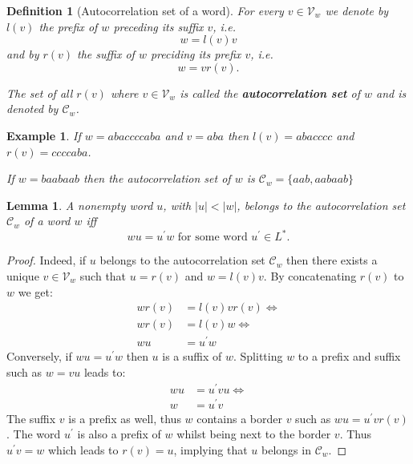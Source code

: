\documentclass[12pt]{report}
\newtheorem{lemma}{Lemma}
\newtheorem{defn}[mythm]{Definition}
\newtheorem{exa}[mythm]{Example}
\begin{document}
{%

\begin{defn}[Autocorrelation set of a word]
For every $v \in \mathcal{V}_w$ we denote by $l(v)$ the prefix of $w$ preceding its suffix $v$, i.e. 
\[ w = l(v) v\] and by $r(v)$ the suffix of $w$ preciding its prefix $v$, i.e. \[w = v r(v).\]

The set of all $r(v)$ where $v \in \mathcal{V}_w$ is called the {\bf autocorrelation set} of $w$ and is denoted by $\mathcal{C}_w$.
\end{defn}

\begin{exa}
If $w=a b a c c c c a b a$ and $v=a b a$ then $l(v) = a b a c c c c$ and $r(v) = c c c c a b a$.

If $w=b a a b a a b$ then the autocorrelation set of $w$ is $\mathcal{C}_w = \{ a a b, a a b a a b\}$
\end{exa}

\begin{lemma}
A nonempty word $u$, with $|u| < |w|$, belongs to the autocorrelation set $\mathcal{C}_w$ of a word $w$ iff 
\[ w u = u^\prime w \textrm{ for some word $u^\prime \in L^*$}. \]
\end{lemma}

\begin{proof}
Indeed, if $u$ belongs to the autocorrelation set $\mathcal{C}_w$ then there exists a unique $v \in \mathcal{V}_w$ such that $u=r(v)$ and $w=l(v)v$. By concatenating $r(v)$ to $w$ we get:
\begin{align*}
w r(v) &= l(v) v r(v) \Leftrightarrow\\
w r(v) &= l(v)w	\Leftrightarrow\\
w u &= u^\prime w
\end{align*}
Conversely, if $w u = u^\prime w$ then $u$ is a suffix of $w$. Splitting $w$ to a prefix and suffix such as $w = vu$ leads to:
\begin{align*}
w u &= u^\prime v u \Leftrightarrow\\
w &= u^\prime v
\end{align*}
The suffix $v$ is a prefix as well, thus $w$ contains a border $v$ such as $w u = u^\prime v r(v)$. The word $u^\prime$ is also a prefix of $w$ whilst being next to the border $v$. Thus $u^\prime v = w$ which leads to $r(v)=u$, implying that $u$ belongs in $\mathcal{C}_w$.
\end{proof}


}
\end{document}
